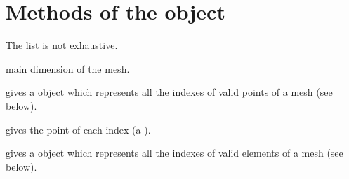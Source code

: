 \documentclass[a4paper,11pt,english]{sphinxmanual}
\begin{document}
\section{Methods of the  object}
\label{\detokenize{userdoc/bmesh:methods-of-the-gf-m-object}}
The list is not exhaustive.

\begin{fulllineitems}
\label{\detokenize{userdoc/bmesh:_CPPv4N6getfem4mesh3dimEv}}%
\pysigstartmultiline
{}%
\pysigstopmultiline
main dimension of the mesh.

\end{fulllineitems}


\begin{fulllineitems}
\label{\detokenize{userdoc/bmesh:_CPPv4N6getfem4mesh12points_indexEv}}%
\pysigstartmultiline
{}%
\pysigstopmultiline
gives a  object which represents all the indexes
of valid points of a mesh (see below).

\end{fulllineitems}


\begin{fulllineitems}
\label{\detokenize{userdoc/bmesh:_CPPv4N6getfem4mesh6pointsEv}}%
\pysigstartmultiline
{}%
\pysigstopmultiline
gives the point of each index (a ).

\end{fulllineitems}


\begin{fulllineitems}
\label{\detokenize{userdoc/bmesh:_CPPv4N6getfem4mesh12convex_indexEv}}%
\pysigstartmultiline
{}%
\pysigstopmultiline
gives a  object which represents all the indexes
of valid elements of a mesh (see below).

\end{fulllineitems}
\end{document}
